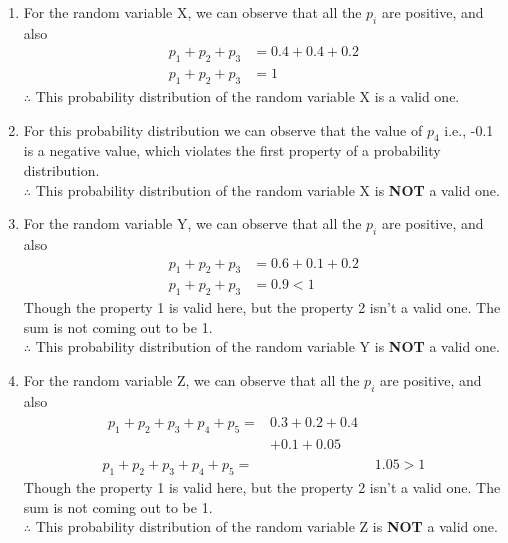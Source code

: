\documentclass[journal,12pt,twocolumn]{IEEEtran}
\begin{document}
\begin{enumerate}[label=(\roman*)]
    \item For the random variable X, we can observe that all the $p_i$ are positive, and also
    \begin{align}
    p_1 + p_2 + p_3 &= 0.4 + 0.4 + 0.2\\ 
   p_1 + p_2 + p_3 &= 1
    \end{align}
    $\therefore$ This probability distribution of the random variable X is a valid one.
	      \item For this probability distribution we can observe that the value of $p_4$ i.e., -0.1 is a negative value, which violates the first property of a probability distribution.\\
	      $\therefore$ This probability distribution of the random variable X is \textbf{NOT} a valid one.
	      \item For the random variable Y, we can observe that all the $p_i$ are positive, and also
	      \begin{align}
	      p_1 + p_2 + p_3 &= 0.6 + 0.1 + 0.2\\
	       p_1 + p_2 + p_3 &= 0.9 < 1
	      \end{align}
	      Though the property 1 is valid here, but the property 2 isn't a valid one. The sum is not coming out to be 1.\\
	      $\therefore$ This probability distribution of the random variable Y is \textbf{NOT} a valid one.
	      \item For the random variable Z, we can observe that all the $p_i$ are positive, and also
 \begin{align}
 \begin{split}
p_1 + p_2 + p_3 + p_4 + p_5 ={}& 0.3 + 0.2 + 0.4 \\
                               &+ 0.1 + 0.05
 \end{split}\\
p_1 + p_2 + p_3 + p_4 + p_5 ={}& 1.05 > 1
 \end{align}
	      Though the property 1 is valid here, but the property 2 isn't a valid one. The sum is not coming out to be 1.\\
	      $\therefore$ This probability distribution of the random variable Z is \textbf{NOT} a valid one.
	\end{enumerate}
\end{document}
